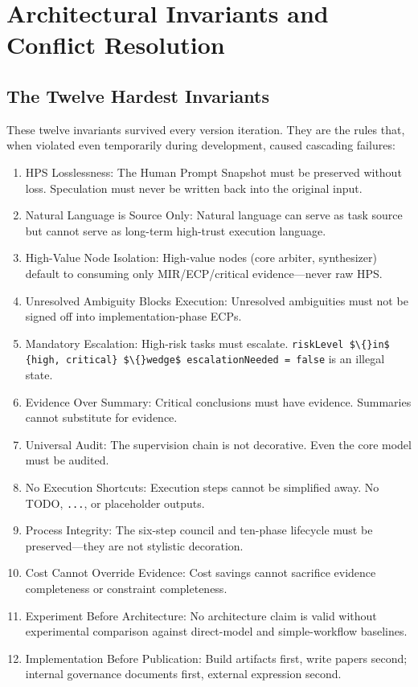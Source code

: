 \documentclass[12pt,a4paper]{article}
\begin{document}
\section{Architectural Invariants and Conflict Resolution}


\subsection{The Twelve Hardest Invariants}


These twelve invariants survived every version iteration. They are the rules that, when violated even temporarily during development, caused cascading failures:

\begin{enumerate}
  \item HPS Losslessness: The Human Prompt Snapshot must be preserved without loss. Speculation must never be written back into the original input.
  \item Natural Language is Source Only: Natural language can serve as task source but cannot serve as long-term high-trust execution language.
  \item High-Value Node Isolation: High-value nodes (core arbiter, synthesizer) default to consuming only MIR/ECP/critical evidence---never raw HPS.
  \item Unresolved Ambiguity Blocks Execution: Unresolved ambiguities must not be signed off into implementation-phase ECPs.
  \item Mandatory Escalation: High-risk tasks must escalate. \texttt{riskLevel \$\textbackslash\{\}in\$ \{high, critical\} \$\textbackslash\{\}wedge\$ escalationNeeded = false} is an illegal state.
  \item Evidence Over Summary: Critical conclusions must have evidence. Summaries cannot substitute for evidence.
  \item Universal Audit: The supervision chain is not decorative. Even the core model must be audited.
  \item No Execution Shortcuts: Execution steps cannot be simplified away. No TODO, \texttt{...}, or placeholder outputs.
  \item Process Integrity: The six-step council and ten-phase lifecycle must be preserved---they are not stylistic decoration.
  \item Cost Cannot Override Evidence: Cost savings cannot sacrifice evidence completeness or constraint completeness.
  \item Experiment Before Architecture: No architecture claim is valid without experimental comparison against direct-model and simple-workflow baselines.
  \item Implementation Before Publication: Build artifacts first, write papers second; internal governance documents first, external expression second.
\end{enumerate}
\end{document}
